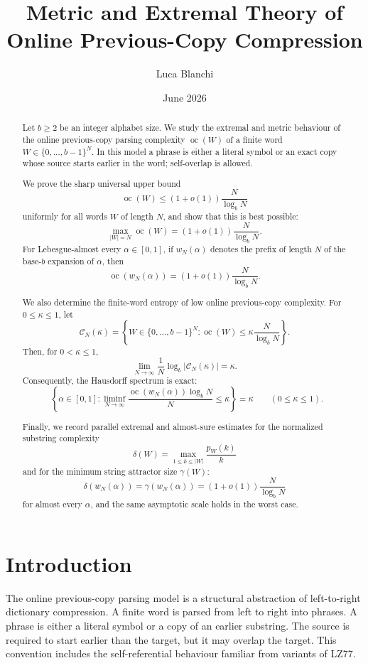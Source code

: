 \documentclass[11pt]{amsart}
\DeclareMathOperator{\oc}{oc}
\DeclareMathOperator{\dimH}{dim_H}
\begin{document}
\title{Metric and Extremal Theory of Online Previous-Copy Compression}

\author{Luca Blanchi}

\date{June 2026}

\begin{abstract}
Let $b\geq2$ be an integer alphabet size. We study the extremal and metric behaviour of the online previous-copy parsing complexity $\oc(W)$ of a finite word $W\in\{0,\ldots,b-1\}^N$. In this model a phrase is either a literal symbol or an exact copy whose source starts earlier in the word; self-overlap is allowed.

We prove the sharp universal upper bound
\[
\oc(W)\leq (1+o(1))\frac{N}{\log_b N}
\]
uniformly for all words $W$ of length $N$, and show that this is best possible:
\[
\max_{|W|=N}\oc(W)
=
(1+o(1))\frac{N}{\log_b N}.
\]
For Lebesgue-almost every $\alpha\in[0,1]$, if $w_N(\alpha)$ denotes the prefix of length $N$ of the base-$b$ expansion of $\alpha$, then
\[
\oc(w_N(\alpha))
=
(1+o(1))\frac{N}{\log_b N}.
\]

We also determine the finite-word entropy of low online previous-copy complexity. For $0\leq \kappa\leq1$, let
\[
\mathcal C_N(\kappa)
=
\left\{
W\in\{0,\ldots,b-1\}^N:
\oc(W)\leq \kappa\frac{N}{\log_b N}
\right\}.
\]
Then, for $0<\kappa\leq1$,
\[
\lim_{N\to\infty}
\frac1N\log_b|\mathcal C_N(\kappa)|
=
\kappa.
\]
Consequently, the Hausdorff spectrum is exact:
\[
\dimH
\left\{
\alpha\in[0,1]:
\liminf_{N\to\infty}
\frac{\oc(w_N(\alpha))\log_b N}{N}
\leq\kappa
\right\}
=
\kappa
\qquad(0\leq\kappa\leq1).
\]

Finally, we record parallel extremal and almost-sure estimates for the normalized substring complexity
\[
\delta(W)=\max_{1\leq k\leq |W|}\frac{p_W(k)}{k}
\]
and for the minimum string attractor size $\gamma(W)$:
\[
\delta(w_N(\alpha))
=
\gamma(w_N(\alpha))
=
(1+o(1))\frac{N}{\log_b N}
\]
for almost every $\alpha$, and the same asymptotic scale holds in the worst case.
\end{abstract}

\maketitle

\section{Introduction}

The online previous-copy parsing model is a structural abstraction of left-to-right dictionary compression. A finite word is parsed from left to right into phrases. A phrase is either a literal symbol or a copy of an earlier substring. The source is required to start earlier than the target, but it may overlap the target. This convention includes the self-referential behaviour familiar from variants of LZ77.
\end{document}
